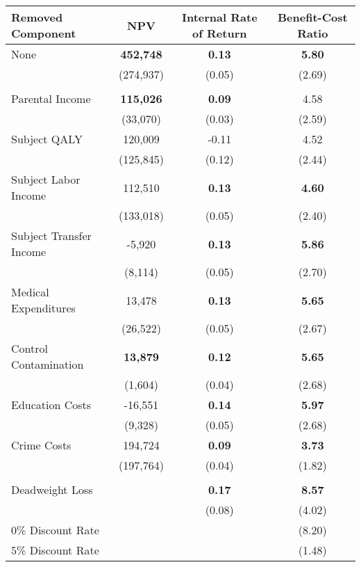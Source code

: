 \begin{tabular}{l c c c} \toprule																			
Removed Component & NPV     &       Internal Rate of Return     &       Benefit-Cost Ratio    \\ \midrule	
None &	\textbf{452,748}	&	\textbf{0.13}	&	\textbf{5.80}	\\
&	(274,937)	&	(0.05)	&	(2.69)	\\ \\
Parental Income &	\textbf{115,026}	&	\textbf{0.09}	&	4.58	\\
&	(33,070)	&	(0.03)	&	(2.59)	\\
Subject QALY &	120,009	&	-0.11	&	4.52	\\
&	(125,845)	&	(0.12)	&	(2.44)	\\
Subject Labor Income &	112,510	&	\textbf{0.13}	&	\textbf{4.60}	\\
&	(133,018)	&	(0.05)	&	(2.40)	\\
Subject Transfer Income &	-5,920	&	\textbf{0.13}	&	\textbf{5.86}	\\
&	(8,114)	&	(0.05)	&	(2.70)	\\
Medical Expenditures &	13,478	&	\textbf{0.13}	&	\textbf{5.65}	\\
&	(26,522)	&	(0.05)	&	(2.67)	\\
Control Contamination &	\textbf{13,879}	&	\textbf{0.12}	&	\textbf{5.65}	\\
&	(1,604)	&	(0.04)	&	(2.68)	\\
Education Costs &	-16,551	&	\textbf{0.14}	&	\textbf{5.97}	\\
&	(9,328)	&	(0.05)	&	(2.68)	\\
Crime Costs	& 194,724	&	\textbf{0.09}	&	\textbf{3.73}	\\
&	(197,764)	&	(0.04)	&	(1.82)	\\ \\
Deadweight Loss &		&	\textbf{0.17}	&	\textbf{8.57}	\\
&		&	(0.08)	&	(4.02)	\\
0\% Discount Rate	&		&		&	(8.20)	\\
5\% Discount Rate	&		&		&	(1.48)	\\
\bottomrule																			
\end{tabular}																			
